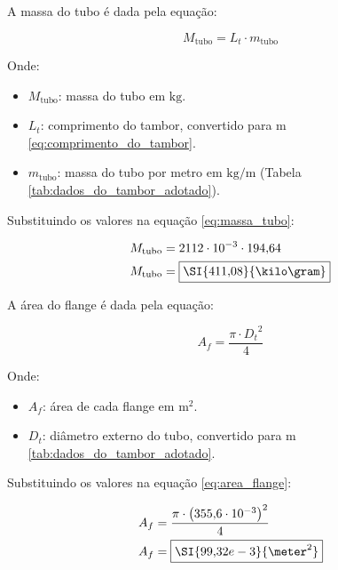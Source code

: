 A massa do tubo é dada pela equação:

\begin{equation}
  M_{\text{tubo}} = L_t \cdot m_{\text{tubo}}
  \label{eq:massa_tubo}
\end{equation}

Onde:

\begin{itemize}[leftmargin=1.25cm]
  \item $M_{\text{tubo}}$: massa do tubo em $\si{\kilo\gram}$.
  \item $L_t$: comprimento do tambor, convertido para $\si{\meter}$ \eqref{eq:comprimento_do_tambor}.
  \item $m_{\text{tubo}}$: massa do tubo por metro em $\si{\kilo\gram/\meter}$ (Tabela \ref{tab:dados_do_tambor_adotado}).
\end{itemize}

\vspace{1em}

Substituindo os valores na equação \eqref{eq:massa_tubo}:

\begin{align*}
  M_{\text{tubo}} & = 2112 \cdot 10^{-3} \cdot 194{,}64 \\
  M_{\text{tubo}} & = \boxed{\SI{411{,}08}{\kilo\gram}}
\end{align*}

A área do flange é dada pela equação:

\begin{equation}
  A_f = \frac{\pi \cdot {D_t}^2}{4}
  \label{eq:area_flange}
\end{equation}

Onde:

\begin{itemize}[leftmargin=1.25cm]
  \item $A_f$: área de cada flange em $\si{\meter^2}$.
  \item $D_t$: diâmetro externo do tubo, convertido para $\si{\meter}$ \ref{tab:dados_do_tambor_adotado}.
\end{itemize}

\vspace{1em}

Substituindo os valores na equação \eqref{eq:area_flange}:

\begin{align*}
  A_f & = \frac{\pi \cdot {\left(355{,}6 \cdot 10^{-3}\right)}^2}{4} \\
  A_f & = \boxed{\SI{99{,}32e-3}{\meter^2}}
\end{align*}

